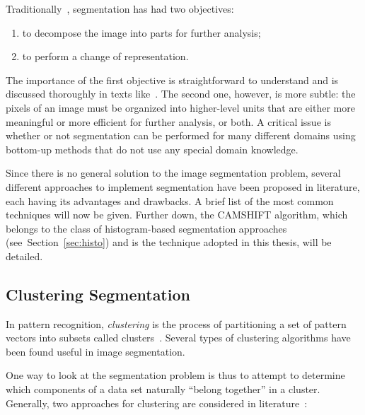 Traditionally~\cite[ch.~10]{shapiro_stockman}, segmentation has had two objectives:
\begin{enumerate}
\item to decompose the image into parts for further analysis;

\item to perform a change of representation.
\end{enumerate}

The importance of the first objective is straightforward to understand and is discussed thoroughly in texts like~\cite{foley, forsyth, shapiro_stockman, trucco_verri}. The second one, however, is more subtle: the pixels of an image must be organized into higher-level units that are either more meaningful or more efficient for further analysis, or both. A critical issue is whether or not segmentation can be performed for many different domains using bottom-up methods that do not use any special domain knowledge.

\bigskip

Since there is no general solution to the image segmentation problem, several different approaches to implement segmentation have been proposed in literature, each having its advantages and drawbacks. A brief list of the most common techniques will now be given. Further down, the \ac{CAMSHIFT} algorithm, which belongs to the class of histogram-based segmentation approaches (see~Section~\ref{sec:histo}) and is the technique adopted in this thesis, will be detailed.

\subsection{Clustering Segmentation}

In pattern recognition, \emph{clustering} is the process of partitioning a set of pattern vectors into subsets called clusters~\cite{theodoridis}. Several types of clustering algorithms have been found useful in image segmentation. %

One way to look at the segmentation problem is thus to attempt to determine which components of a data set naturally ``belong together'' in a cluster. Generally, two approaches for clustering are considered in literature~\cite{forsyth}:

